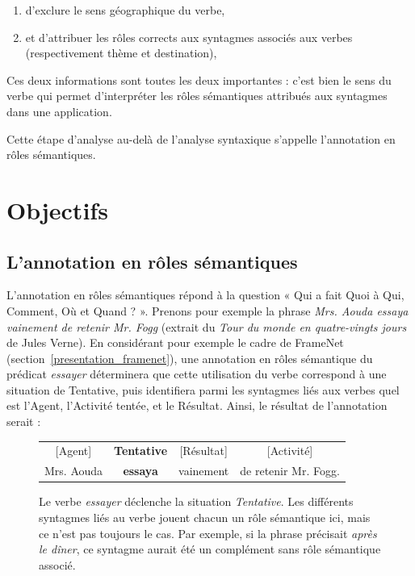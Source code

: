 \begin{enumerate}
    \item d'exclure le sens géographique du verbe,
    \item et d'attribuer les rôles corrects aux syntagmes associés aux verbes
        (respectivement thème et destination),
\end{enumerate}


Ces deux informations sont toutes les deux importantes : c'est bien le sens du
verbe qui permet d'interpréter les rôles sémantiques attribués aux syntagmes
dans une application.

Cette étape d'analyse au-delà de l'analyse syntaxique s'appelle l'annotation en
rôles sémantiques.

\section{Objectifs}

\subsection{L'annotation en rôles sémantiques}

L'annotation en rôles sémantiques répond à la question « Qui a fait Quoi à Qui,
Comment, Où et Quand ? ». Prenons pour exemple la phrase \textit{Mrs. Aouda
essaya vainement de retenir Mr. Fogg} (extrait du \textit{Tour du monde en
quatre-vingts jours} de Jules Verne).  En considérant pour exemple le cadre de
FrameNet (section~\ref{presentation_framenet}), une annotation en rôles
sémantique du prédicat \textit{essayer} déterminera que cette utilisation du
verbe correspond à une situation de Tentative, puis identifiera parmi les
syntagmes liés aux verbes quel est l'Agent, l'Activité tentée, et le Résultat.
Ainsi, le résultat de l'annotation serait :

\begin{figure}[ht]
    \centering
    \begin{tabular}{cccc}
    [Agent]  & \textbf{Tentative} & [Résultat]  & [Activité]         \tabularnewline
    Mrs. Aouda & \textbf{essaya}  & vainement & de retenir Mr. Fogg. \tabularnewline
    \end{tabular}
    \caption{\label{fig:introsrl}Le verbe \textit{essayer} déclenche la situation
        \textit{Tentative}. Les différents syntagmes liés au verbe jouent chacun
        un rôle sémantique ici, mais ce n'est pas toujours le cas. Par exemple,
        si la phrase précisait \textit{après le dîner}, ce syntagme aurait été un
    complément sans rôle sémantique associé.}

\end{figure}

